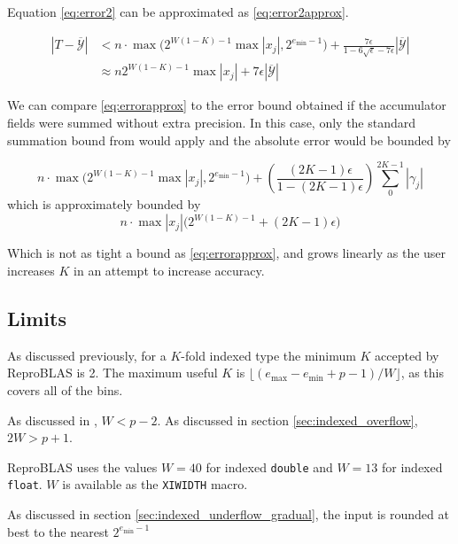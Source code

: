     Equation \eqref{eq:error2} can be approximated as  \eqref{eq:error2approx}.

    \begin{align}
      |T - \overline{\mathcal{Y}}| &< n \cdot \max\bigl(2^{W  (1 - K) - 1}  \max|x_j|, 2^{e_{\min} - 1}\bigr) + \frac{7\epsilon}{1 - 6 \sqrt \epsilon - 7\epsilon}  \left|\overline{\mathcal{Y}}\right| \nonumber \\
      &\approx n  2^{W  (1 - K) - 1} \max|x_j|+ 7 \epsilon \left|\overline{\mathcal{Y}}\right|
      \label{eq:error2approx}
    \end{align}

    We can compare  \eqref{eq:errorapprox} to the error bound obtained if the accumulator fields were summed without extra precision. In this case, only the standard summation bound from \cite{higham} would apply and the absolute error would be bounded by

    \begin{equation*}
    n \cdot \max\bigl(2^{W  (1 - K) - 1}  \max|x_j|, 2^{e_{\min} - 1}\bigr) + \left(\frac{(2  K - 1)  \epsilon}{1 - (2  K - 1)  \epsilon}\right)  \sum\limits_0^{2  K - 1}|\gamma_j|
    \end{equation*}
    which is approximately bounded by
    \begin{equation}
    n \cdot \max|x_j| \bigl(2^{W  (1 - K) - 1} + (2  K - 1)  \epsilon\bigr)
    \label{eq:baderrorapprox}
    \end{equation}

    Which is not as tight a bound as \eqref{eq:errorapprox}, and grows linearly as the user increases $K$ in an attempt to increase accuracy.

  \subsection{Limits}
    \label{sec:primitiveops_limits}
    As discussed previously, for a $K$-fold indexed type the minimum $K$ accepted by ReproBLAS is 2. The maximum useful $K$ is $\lfloor(e_{\max} - e_{\min} + p - 1)/W\rfloor$, as this covers all of the bins.

    As discussed in \cite{repsum}, $W < p - 2$. As discussed in section \ref{sec:indexed_overflow}, $2 W > p + 1$.

    ReproBLAS uses the values $W = 40$ for indexed \texttt{double} and $W = 13$ for indexed \texttt{float}. $W$ is available as the \texttt{XIWIDTH} macro.

    As discussed in section \ref{sec:indexed_underflow_gradual}, the input is rounded at best to the nearest $2^{e_{\min} - 1}$

